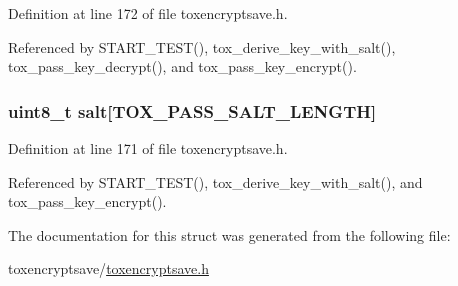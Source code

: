 Definition at line 172 of file toxencryptsave.\+h.



Referenced by S\+T\+A\+R\+T\+\_\+\+T\+E\+S\+T(), tox\+\_\+derive\+\_\+key\+\_\+with\+\_\+salt(), tox\+\_\+pass\+\_\+key\+\_\+decrypt(), and tox\+\_\+pass\+\_\+key\+\_\+encrypt().

\hypertarget{struct_t_o_x___p_a_s_s___k_e_y_a6434f2e799e75beacc91c217bc797339}{
\subsubsection[{salt}]{\setlength{\rightskip}{0pt plus 5cm}uint8\+\_\+t salt\mbox{[}{\bf T\+O\+X\+\_\+\+P\+A\+S\+S\+\_\+\+S\+A\+L\+T\+\_\+\+L\+E\+N\+G\+T\+H}\mbox{]}}}\label{struct_t_o_x___p_a_s_s___k_e_y_a6434f2e799e75beacc91c217bc797339}


Definition at line 171 of file toxencryptsave.\+h.



Referenced by S\+T\+A\+R\+T\+\_\+\+T\+E\+S\+T(), tox\+\_\+derive\+\_\+key\+\_\+with\+\_\+salt(), and tox\+\_\+pass\+\_\+key\+\_\+encrypt().



The documentation for this struct was generated from the following file\+:\begin{DoxyCompactItemize}
\item 
toxencryptsave/\hyperlink{toxencryptsave_8h}{toxencryptsave.\+h}\end{DoxyCompactItemize}
